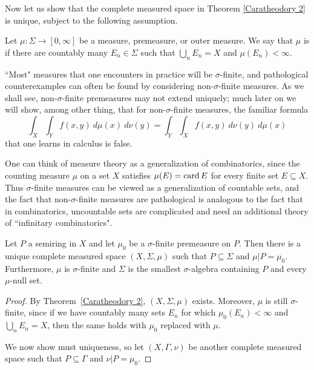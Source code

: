 \begin{subsec}
Now let us show that the complete measured space in Theorem \ref{Caratheodory 2} is unique, subject to the following assumption.
\end{subsec}

\begin{definition}
Let $\mu: \Sigma \to [0, \infty]$ be a measure, premeasure, or outer measure.
We say that $\mu$ is  if there are countably many $E_{n} \in \Sigma$ such that $\bigcup_{n} E_{n} = X$ and $\mu(E_{n}) < \infty$.
\end{definition}

\begin{subsec}
``Most" measures that one encounters in practice will be $\sigma$-finite, and pathological counterexamples can often be found by considering non-$\sigma$-finite measures.
As we shall see, non-$\sigma$-finite premeasures may not extend uniquely; much later on we will show, among other thing, that for non-$\sigma$-finite measures, the familiar formula
$$\int_X \int_Y f(x, y) ~d\mu(x) ~d\nu(y) = \int_Y \int_X f(x, y) ~d\nu(y) ~d\mu(x)$$
that one learns in calculus is false.

One can think of measure theory as a generalization of combinatorics, since the counting measure $\mu$ on a set $X$ satisfies $\mu(E) = \operatorname{card} E$ for every finite set $E \subseteq X$.
Thus $\sigma$-finite measures can be viewed as a generalization of countable sets, and the fact that non-$\sigma$-finite measures are pathological is analogous to the fact that in combinatorics, uncountable sets are complicated and need an additional theory of ``infinitary combinatorics".
\end{subsec}

\begin{theorem}\label{unique extensions}
Let $P$ a semiring in $X$ and let $\mu_{0}$ be a $\sigma$-finite premeasure on $P$.
Then there is a unique complete measured space $(X, \Sigma, \mu)$ such that $P \subseteq \Sigma$ and $\mu|P = \mu_{0}$.
Furthermore, $\mu$ is $\sigma$-finite and $\Sigma$ is the smallest $\sigma$-algebra containing $P$ and every $\mu$-null set.
\end{theorem}
\begin{proof}
By Theorem~\ref{Caratheodory 2}, $(X, \Sigma, \mu)$ exists.
Moreover, $\mu$ is still $\sigma$-finite, since if we have countably many sets $E_{n}$ for which $\mu_{0}(E_{n}) < \infty$ and $\bigcup_{n} E_{n} = X$, then the same holds with $\mu_{0}$ replaced with $\mu$.

We now show must uniqueness, so let $(X, \Gamma, \nu)$ be another complete measured space such that $P \subseteq \Gamma$ and $\nu|P = \mu_{0}$.

\end{proof}

